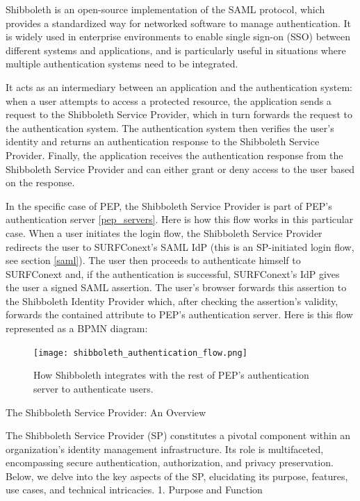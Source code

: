 \documentclass{report}
\begin{document}
Shibboleth is an open-source implementation of the SAML protocol, which provides a standardized way for networked software to manage authentication. It is widely used in enterprise
environments to enable single sign-on (SSO) between different systems and applications, and is particularly useful in situations where multiple authentication systems need to be
integrated. \par
It acts as an intermediary between an application and the authentication system: when a user attempts to access a protected resource, the application sends a request to the
Shibboleth Service Provider, which in turn forwards the request to the authentication system. The authentication system then verifies the user's identity and returns an
authentication response to the Shibboleth Service Provider. Finally, the application receives the authentication response from the Shibboleth Service Provider and can either grant or 
deny access to the user based on the response. \par
In the specific case of PEP, the Shibboleth Service Provider is part of PEP's authentication server \ref{pep_servers}. Here is how this flow works in this particular case.
When a user initiates the login flow, the Shibboleth Service Provider redirects the user to SURFConext's SAML IdP (this is an SP-initiated login flow, see section \ref{saml}). The
user then proceeds to authenticate himself to SURFConext and, if the authentication is successful, SURFConext's IdP gives the user a signed SAML assertion. The user's browser
forwards this assertion to the Shibboleth Identity Provider which, after checking the assertion's validity, forwards the contained attribute to PEP's authentication server. Here is
this flow represented as a BPMN diagram:

\begin{figure}[H]
		\vspace*{-100pt} %
		\texttt{[image: shibboleth\_authentication\_flow.png]}
		\caption{How Shibboleth integrates with the rest of PEP's authentication server to authenticate users.}
\end{figure}




\iffalse
The Shibboleth Service Provider: An Overview

The Shibboleth Service Provider (SP) constitutes a pivotal component within an organization’s identity management infrastructure. Its role is multifaceted, encompassing secure authentication, authorization, and privacy preservation. Below, we delve into the key aspects of the SP, elucidating its purpose, features, use cases, and technical intricacies.
1. Purpose and Function
\end{document}
